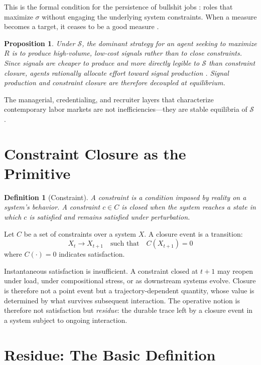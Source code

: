 \documentclass[12pt]{article}
\newtheorem{definition}{Definition}
\newtheorem{proposition}{Proposition}
\begin{document}
This is the formal condition for the persistence of bullshit jobs \cite{graeber2018}: roles
that maximize $\sigma$ without engaging the underlying system
constraints. When a measure becomes a target, it ceases to be a good
measure \cite{goodhart1975,strathern1997}.

\begin{proposition}
Under $\mathcal{S}$, the dominant strategy for an agent seeking to
maximize $R$ is to produce high-volume, low-cost signals rather than to
close constraints. Since signals are cheaper to produce and more directly
legible to $\mathcal{S}$ than constraint closure, agents rationally
allocate effort toward signal production \cite{simon1955,arrow1970}.
Signal production and constraint closure are therefore decoupled at
equilibrium.
\end{proposition}

The managerial, credentialing, and recruiter layers that characterize
contemporary labor markets are not inefficiencies---they are stable
equilibria of $\mathcal{S}$ \cite{lucas1976}.

\section{Constraint Closure as the Primitive}

\begin{definition}[Constraint]
A \emph{constraint} is a condition imposed by reality on a system's
behavior. A constraint $c \in C$ is \emph{closed} when the system
reaches a state in which $c$ is satisfied and remains satisfied under
perturbation.
\end{definition}

Let $C$ be a set of constraints over a system $X$. A closure event is a
transition:
\[
  X_t \rightarrow X_{t+1} \quad \text{such that} \quad C(X_{t+1}) = 0
\]
where $C(\cdot) = 0$ indicates satisfaction.

Instantaneous satisfaction is insufficient. A constraint closed at
$t+1$ may reopen under load, under compositional stress, or as
downstream systems evolve. Closure is therefore not a point event but a
trajectory-dependent quantity, whose value is determined by what
survives subsequent interaction. The operative notion is therefore not
satisfaction but \emph{residue}: the durable trace left by a closure
event in a system subject to ongoing interaction.

\section{Residue: The Basic Definition}
\end{document}
